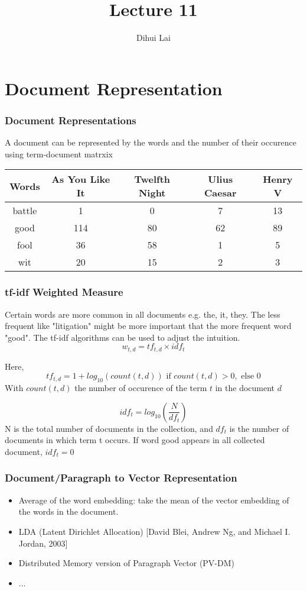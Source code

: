 \documentclass[notheorems, aspectratio=54]{beamer}
\title{Lecture 11}
\author{Dihui Lai}
\institute[WUSTL]{dlai@wustl.edu}
\begin{document}
\begin{frame}
    \titlepage
\end{frame}

\section{Document Representation}



\begin{frame}
\frametitle{Document Representations}
A document can be represented by the words and the number of their occurence using term-document matrxix
\begin{center}
 \begin{tabular}{c c c c c} 
 \hline
 Words & As You Like It& Twelfth Night& Ulius Caesar& Henry V\\ [0.5ex] 
 \hline\hline
 battle & 1 & 0 & 7 &13 \\ 
 \hline
 good & 114 & 80 &62 & 89\\
 \hline
 fool & 36 & 58 & 1 & 5 \\
 \hline
 wit & 20 & 15 & 2 & 3 \\
 \hline
\end{tabular}
\end{center}

\end{frame}


\begin{frame}
\frametitle{tf-idf Weighted Measure}
Certain words are more common in all documents e.g. the, it, they. The less frequent like "litigation" might be more important that the more frequent word "good". The tf-idf algorithms can be used to adjust the intuition.
$$
w_{t,d} = tf_{t,d}\times idf_{t}
$$

Here,
$$
tf_{t, d}=1 + log_{10}(count(t, d)) \text{ if } count(t, d) > 0, \text{ else } 0
$$
With $count(t, d)$  the number of occurence of the term $t$ in the document $d$

$$
idf_{t}=log_{10}\left(\frac{N}{df_t}\right)
$$ 
N is the total number of documents in the collection, and $df_t$ is the number of documents in which term t occurs. If word good appears in all collected document, $idf_t=0$

\end{frame}

\begin{frame}
\frametitle{Document/Paragraph to Vector Representation}

\begin{itemize}
\item Average of the word embedding: take the mean of the vector embedding of the words in the document. 
\item LDA (Latent Dirichlet Allocation) [David Blei, Andrew Ng, and Michael I. Jordan, 2003]
\item Distributed Memory version of Paragraph Vector (PV-DM)
\item ...
\end{itemize}

\end{frame}
\end{document}
